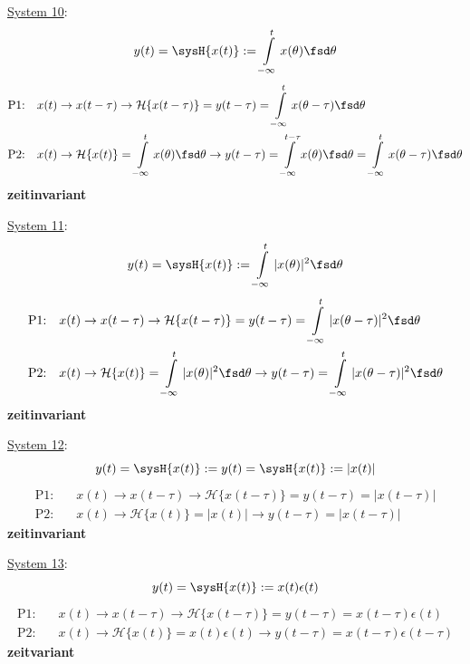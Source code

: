 \begin{Loesung}
\item  \underline{System 10}:
\begin{equation}
y(t) = \sysH{x(t)}:= \int\limits_{-\infty}^{t} x(\theta) \fsd \theta
\end{equation}
\begin{align}
\text{P1:}& \quad x(t)\rightarrow x(t-\tau)\rightarrow \mathcal{H}\{x(t-\tau)\}=y(t-\tau)=\int\limits_{-\infty}^{t} x(\theta-\tau) \fsd \theta\\
\text{P2:}& \quad x(t)\rightarrow \mathcal{H}\{x(t)\}=\int\limits_{-\infty}^{t} x(\theta) \fsd \theta\rightarrow y(t-\tau)=
\int\limits_{-\infty}^{t-\tau} x(\theta) \fsd \theta = \int\limits_{-\infty}^{t} x(\theta-\tau) \fsd \theta
\end{align}
\textbf{zeitinvariant}

\item  \underline{System 11}:
\begin{equation}
y(t) = \sysH{x(t)}:= \int\limits_{-\infty}^{t} |x(\theta)|^2 \fsd \theta
\end{equation}
\begin{align}
\text{P1:}& \quad x(t)\rightarrow x(t-\tau)\rightarrow \mathcal{H}\{x(t-\tau)\}=y(t-\tau)=\int\limits_{-\infty}^{t} |x(\theta-\tau)|^2 \fsd \theta\\
\text{P2:}& \quad x(t)\rightarrow \mathcal{H}\{x(t)\}=\int\limits_{-\infty}^{t} |x(\theta)|^2 \fsd \theta\rightarrow y(t-\tau)=\int\limits_{-\infty}^{t} |x(\theta-\tau)|^2 \fsd \theta
\end{align}
\textbf{zeitinvariant}


\item  \underline{System 12}:
\begin{equation}
y(t) = \sysH{x(t)}:= y(t) = \sysH{x(t)}:= |x(t)|
\end{equation}
\begin{align}
\text{P1:}& \quad x(t)\rightarrow x(t-\tau)\rightarrow \mathcal{H}\{x(t-\tau)\}=y(t-\tau)=|x(t-\tau)|\\
\text{P2:}& \quad x(t)\rightarrow \mathcal{H}\{x(t)\}=|x(t)|\rightarrow y(t-\tau) = |x(t-\tau)|
\end{align}
\textbf{zeitinvariant}

\item  \underline{System 13}:
\begin{equation}
y(t) = \sysH{x(t)}:= x(t) \epsilon(t)
\end{equation}
\begin{align}
\text{P1:}& \quad x(t)\rightarrow x(t-\tau)\rightarrow \mathcal{H}\{x(t-\tau)\}=y(t-\tau)=x(t-\tau) \epsilon(t)\\
\text{P2:}& \quad x(t)\rightarrow \mathcal{H}\{x(t)\}=x(t) \epsilon(t) \rightarrow y(t-\tau)=x(t-\tau) \epsilon(t-\tau)
\end{align}
\textbf{zeitvariant}


\end{Loesung}
